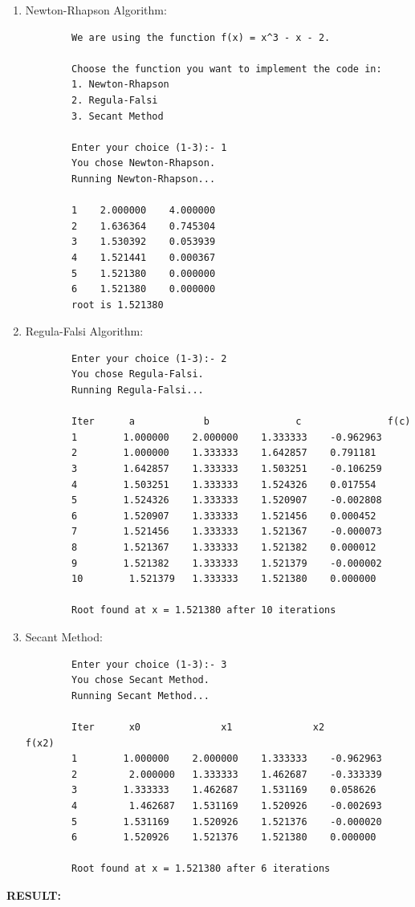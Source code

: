 \documentclass[12pt]{report}
\begin{document}
  \begin{enumerate}
    \item Newton-Rhapson Algorithm: 
      \begin{verbatim} 
        We are using the function f(x) = x^3 - x - 2. 

        Choose the function you want to implement the code in: 
        1. Newton-Rhapson 
        2. Regula-Falsi 
        3. Secant Method

        Enter your choice (1-3):- 1
        You chose Newton-Rhapson.
        Running Newton-Rhapson... 

        1	 2.000000	 4.000000
        2	 1.636364	 0.745304
        3	 1.530392	 0.053939
        4	 1.521441	 0.000367
        5	 1.521380	 0.000000
        6	 1.521380	 0.000000
        root is 1.521380 
      \end{verbatim}
    \item Regula-Falsi Algorithm: 
      \begin{verbatim}
        Enter your choice (1-3):- 2
        You chose Regula-Falsi.
        Running Regula-Falsi...
        
        Iter	  a		       b		       c		       f(c)
        1	     1.000000	 2.000000	 1.333333	 -0.962963
        2	     1.000000	 1.333333	 1.642857	 0.791181
        3	     1.642857	 1.333333	 1.503251	 -0.106259
        4	     1.503251	 1.333333	 1.524326	 0.017554
        5	     1.524326	 1.333333	 1.520907	 -0.002808
        6	     1.520907	 1.333333	 1.521456	 0.000452
        7	     1.521456	 1.333333	 1.521367	 -0.000073
        8	     1.521367	 1.333333	 1.521382	 0.000012
        9	     1.521382	 1.333333	 1.521379	 -0.000002
        10  	  1.521379	 1.333333	 1.521380	 0.000000

        Root found at x = 1.521380 after 10 iterations
      \end{verbatim}
    \item Secant Method: 
      \begin{verbatim}
        Enter your choice (1-3):- 3
        You chose Secant Method.
        Running Secant Method...

        Iter	  x0		      x1		      x2		      f(x2)
        1	     1.000000	 2.000000	 1.333333	 -0.962963
        2   	  2.000000	 1.333333	 1.462687	 -0.333339
        3	     1.333333	 1.462687	 1.531169	 0.058626
        4   	  1.462687	 1.531169	 1.520926	 -0.002693
        5	     1.531169	 1.520926	 1.521376	 -0.000020
        6	     1.520926	 1.521376	 1.521380	 0.000000

        Root found at x = 1.521380 after 6 iterations
      \end{verbatim}
  \end{enumerate}
  \textbf{RESULT:} \\
\end{document}
